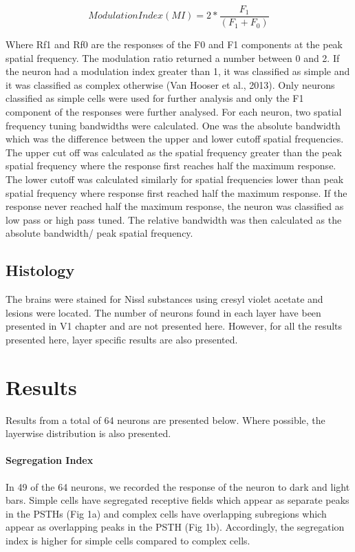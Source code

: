 				\[Modulation Index (MI)= 2*\frac{F_1}{(F_1+F_0)}\]
				
				Where Rf1 and Rf0 are the responses of the F0 and F1 components at the peak spatial frequency.
				The modulation ratio returned a number between 0 and 2. If the neuron had a modulation index greater than 1, it was classified as simple and it was classified as complex otherwise (Van Hooser et al., 2013). Only neurons classified as simple cells were used for further analysis and only the F1 component of the responses were further analysed.
				For each neuron, two spatial frequency tuning bandwidths were calculated. One was the absolute bandwidth which was the difference between the upper and lower cutoff spatial frequencies. The upper cut off was calculated as the spatial frequency greater than the peak spatial frequency where the response first reaches half the maximum response. The lower cutoff was calculated similarly for spatial frequencies lower than peak spatial frequency where response first reached half the maximum response. If the response never reached half the maximum response, the neuron was classified as low pass or high pass tuned. The relative bandwidth was then calculated as the absolute bandwidth/ peak spatial frequency.
				
		\subsection{Histology}
				The brains were stained for Nissl substances using cresyl violet acetate and lesions were located. The number of neurons found in each layer have been presented in V1 chapter and are not presented here. However, for all the results presented here, layer specific results are also presented.
							
					

	\section{Results}
	
		Results from a total of 64 neurons are presented below. Where possible, the layerwise distribution is also presented. 
	

		
	\paragraph {Segregation Index}	
	In 49 of the 64 neurons, we recorded the response of the neuron to dark and light bars. Simple cells have segregated receptive fields which appear as separate peaks in the PSTHs (Fig 1a) and complex cells have overlapping subregions which appear as overlapping peaks in the PSTH (Fig 1b). Accordingly, the segregation index is higher for simple cells compared to complex cells.
	
